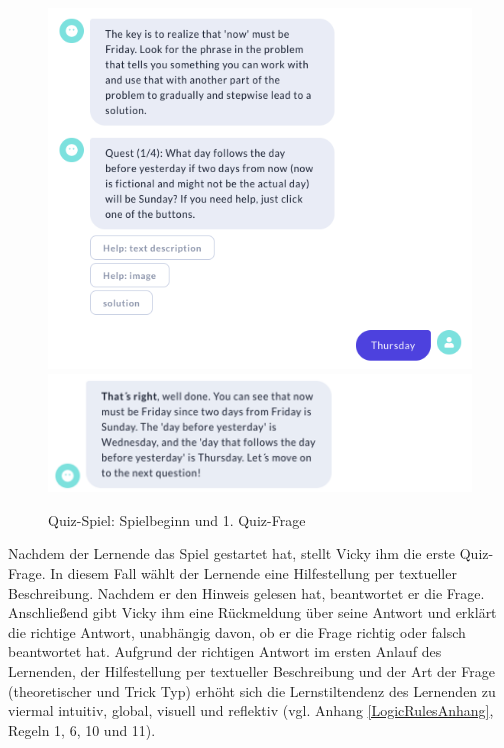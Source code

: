 \begin{figure}[H]
  \centering 
  \includegraphics[width=0.7\linewidth]{images/game/q1.1.png}
  \includegraphics[width=0.7\linewidth]{images/game/q1.2.png}

  \caption[Quiz-Spiel: Spielbeginn und 1. Quiz-Frage]{Quiz-Spiel: Spielbeginn und 1. Quiz-Frage}
  \label{fig:Spielbeginn_und_1._Quiz-Frage}
\end{figure} 
Nachdem der Lernende das Spiel gestartet hat, stellt Vicky ihm die erste Quiz-Frage.
In diesem Fall wählt der Lernende eine Hilfestellung per textueller Beschreibung.
Nachdem er den Hinweis gelesen hat, beantwortet er die Frage. Anschließend 
gibt Vicky ihm eine Rückmeldung über seine Antwort und erklärt die richtige Antwort,
unabhängig davon, ob er die Frage richtig oder falsch beantwortet hat.
Aufgrund der richtigen Antwort im ersten Anlauf des Lernenden, der Hilfestellung per textueller
Beschreibung und der Art der Frage (theoretischer und Trick Typ) erhöht sich die 
Lernstiltendenz des Lernenden zu viermal intuitiv, global, visuell und reflektiv (vgl. Anhang \ref{LogicRulesAnhang}, Regeln 1, 6, 10 und 11).


